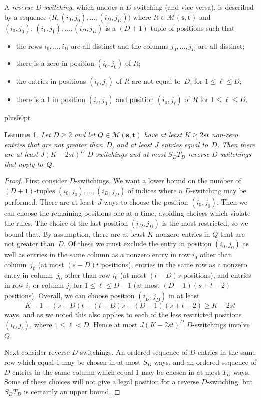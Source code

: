 \documentclass[12pt]{article}
\newtheorem{lemma}[theorem]{Lemma}
\numberwithin{equation}{section}
\def\M{{\mathcal{M}}}
\def\({\bigl(}   \def\){\bigr)}
\def\svec{{\boldsymbol{s}}}
\def\tvec{{\boldsymbol{t}}}
\def\nicebreak{\vskip0pt plus50pt\penalty-300\vskip0pt plus-50pt }
\def\Mst{{\M(\svec,\tvec)}}
\begin{document}
\smallskip
A \textit{reverse $D$-switching}, which undoes a
$D$-switching (and vice-versa),
is described by a sequence
$\(R;(i_0,j_0),\ldots, (i_D,j_D)\)$
where $R\in\Mst$ and $(i_0,j_0),\, (i_1,j_1),\ldots, (i_D,j_D)$ is a
$(D{+}1)$-tuple of positions such that
\begin{itemize}\itemsep=0pt
\item the rows $i_0,\ldots, i_D$ are all distinct and the columns
$j_0,\ldots, j_D$ are all distinct;
\item there is a zero in position $(i_0,j_0)$ of $R$;
\item the entries in positions $(i_\ell,j_\ell)$ of $R$ are 
  not equal to~$D$, for $1\leq \ell\leq D$;
\item there is a 1 in position $(i_\ell,j_0)$ and position
$(i_0,j_\ell)$ of $R$ for $1\leq \ell\leq D$.
\end{itemize}

\nicebreak
\begin{lemma}\label{ab}
Let $D\ge 2$ and let $Q\in\Mst$ have at least $K\ge 2st$
non-zero entries that are not greater than~$D$, and at least
$J$ entries equal to~$D$.
Then there are at least $J(K-2st)^D$ $D$-switchings
and at most $S_D T_D$ reverse $D$-switchings that apply to~$Q$.
\end{lemma}

\begin{proof}
First consider $D$-switchings.
We want a lower bound on the number of
$(D{+}1)$-tuples $(i_0,j_0),\ldots, (i_D,j_D)$
of indices where a $D$-switching may be performed.
There are at least~$J$ ways to choose the position $(i_0,j_0)$.
Then we can choose the remaining positions one at a time, avoiding
choices which violate the rules.  The choice of the last position
$(i_D,j_D)$ is the most restricted, so we bound that.
By assumption, there are at least $K$ nonzero entries in $Q$
that are not greater than~$D$.
Of these we must exclude the entry in position $(i_0,j_0)$
as well as entries in the same column as a nonzero entry in row
$i_0$ other than column~$j_0$ (at most $(s-D)t$ positions),
entries in the same row as a nonzero
entry in column~$j_0$ other than row $i_0$ (at most $(t-D)s$ positions), and entries
in row $i_\ell$ or column $j_\ell$ for $1\leq \ell\leq D-1$ (at most
$(D-1)(s+t-2)$ positions).
Overall, we can choose position $(i_D,j_D)$ in at least
\[ K - 1 - (s-D)t - (t-D)s - (D-1)(s+t-2) \geq K - 2st \]
ways, and as we noted this also applies to
each of the less restricted positions $(i_\ell,j_\ell)$, where
$1\leq \ell < D$.  Hence at most $J(K - 2st)^D$
$D$-switchings involve~$Q$.

Next consider reverse $D$-switchings.
An ordered sequence of $D$ entries in the same row which
equal 1 may be chosen in at most $S_D$ ways, and an ordered sequence
of $D$ entries in the same column which equal 1 may be chosen in at
most $T_D$ ways.  Some of these choices will not give a legal position
for a reverse $D$-switching, but $S_DT_D$ is certainly an
upper bound.
\end{proof}
\end{document}
